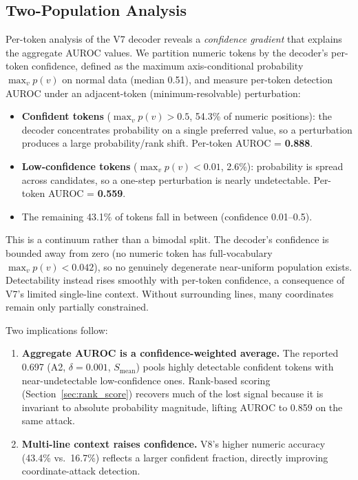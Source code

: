 \subsection{Two-Population Analysis}
\label{sec:results_two_populations}

Per-token analysis of the V7 decoder reveals a \emph{confidence gradient} that explains the aggregate AUROC values.
We partition numeric tokens by the decoder's per-token confidence, defined as the maximum axis-conditional probability $\max_v p(v)$ on normal data (median 0.51), and measure per-token detection AUROC under an adjacent-token (minimum-resolvable) perturbation:

\begin{itemize}
    \item \textbf{Confident tokens} ($\max_v p(v) > 0.5$, 54.3\% of numeric positions): the decoder concentrates probability on a single preferred value, so a perturbation produces a large probability/rank shift. Per-token AUROC = \textbf{0.888}.
    \item \textbf{Low-confidence tokens} ($\max_v p(v) < 0.01$, 2.6\%): probability is spread across candidates, so a one-step perturbation is nearly undetectable. Per-token AUROC = \textbf{0.559}.
    \item The remaining 43.1\% of tokens fall in between (confidence 0.01--0.5).
\end{itemize}

This is a continuum rather than a bimodal split.
The decoder's confidence is bounded away from zero (no numeric token has full-vocabulary $\max_v p(v) < 0.042$), so no genuinely degenerate near-uniform population exists.
Detectability instead rises smoothly with per-token confidence, a consequence of V7's limited single-line context.
Without surrounding lines, many coordinates remain only partially constrained.

Two implications follow:

\begin{enumerate}
    \item \textbf{Aggregate AUROC is a confidence-weighted average.} The reported 0.697 (A2, $\delta = 0.001$, $S_{\text{mean}}$) pools highly detectable confident tokens with near-undetectable low-confidence ones. Rank-based scoring (Section~\ref{sec:rank_score}) recovers much of the lost signal because it is invariant to absolute probability magnitude, lifting AUROC to 0.859 on the same attack.
    \item \textbf{Multi-line context raises confidence.} V8's higher numeric accuracy (43.4\% vs.\ 16.7\%) reflects a larger confident fraction, directly improving coordinate-attack detection.
\end{enumerate}

